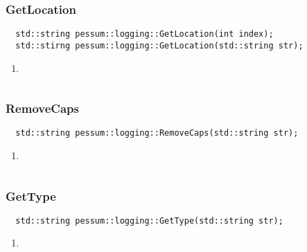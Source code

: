 \documentclass{subfiles}
\begin{document}
\subsubsection{GetLocation}
\begin{lstlisting}
  std::string pessum::logging::GetLocation(int index);
  std::stirng pessum::logging::GetLocation(std::string str);
\end{lstlisting}
\begin{enumerate}
	\item
\end{enumerate}
\begin{lstlisting}

\end{lstlisting}
\newpage
\subsubsection{RemoveCaps}
\begin{lstlisting}
  std::string pessum::logging::RemoveCaps(std::string str);
\end{lstlisting}
\begin{enumerate}
	\item
\end{enumerate}
\begin{lstlisting}

\end{lstlisting}
\newpage
\subsubsection{GetType}
\begin{lstlisting}
  std::string pessum::logging::GetType(std::string str);
\end{lstlisting}
\begin{enumerate}
	\item
\end{enumerate}
\begin{lstlisting}

\end{lstlisting}
\newpage
\end{document}
